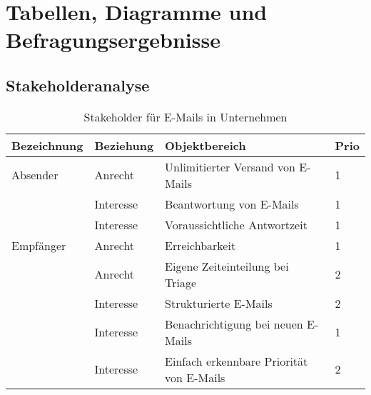 
\chapter{Tabellen, Diagramme und Befragungsergebnisse}
\label{Tabellen_Modelle_Diagramme}

\section{Stakeholderanalyse}

\begin{table}[H]
	\centering
	\caption[Stakeholderanalyse]{Stakeholder für E-Mails in Unternehmen}
		\vspace{1.0em}	
    \begin{tabular}{|l|l|l|l|}
    \rowcolor{red!25}
    \hline
    \textbf{Bezeichnung}                   & \textbf{Beziehung} & \textbf{Objektbereich}                                             & \textbf{Prio} \\ \hline
    Absender              & Anrecht            & Unlimitierter Versand von E-Mails                                  & 1                  \\ \cline{2-4} 
                                           & Interesse          & Beantwortung von E-Mails                                           & 1                  \\ \cline{2-4} 
                                           & Interesse          & Voraussichtliche Antwortzeit                                       & 1                  \\ \hline
    Empfänger             & Anrecht            & Erreichbarkeit                                                     & 1                  \\ \cline{2-4} 
                                           & Anrecht            & Eigene Zeiteinteilung bei Triage                                   & 2                  \\ \cline{2-4} 
                                           & Interesse          & Strukturierte E-Mails                                              & 2                  \\ \cline{2-4} 
                                           & Interesse          & Benachrichtigung bei neuen E-Mails                                   & 1                  \\ \cline{2-4} 
                                           & Interesse          & Einfach erkennbare Priorität von E-Mails                           & 2                  \\ \hline

\end{tabular}
\end{table}
